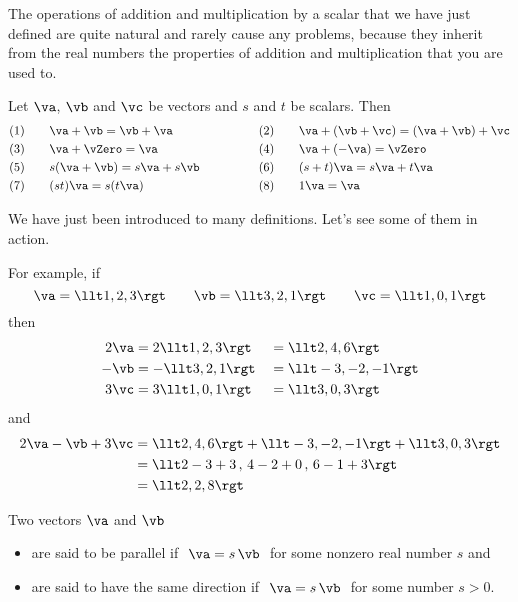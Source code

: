 The operations of addition and multiplication by a scalar that we have just
defined are quite natural and rarely cause any problems, because 
they inherit from the real numbers the properties of  addition and 
multiplication that you are used to. 
\begin{theorem}
                    \label{thm:addScalMult}
Let $\va$, $\vb$ and $\vc$ be vectors and $s$ and $t$ be scalars. Then 
\begin{alignat*}{5}
& (1)\quad&&\va+\vb=\vb+\va \qquad\qquad\qquad
&& (2)\quad&&\va+(\vb+\vc)=(\va+\vb)+\vc\\
& (3) &&\va+\vZero =\va 
&& (4) &&\va+(-\va)=\vZero\\
& (5) &&s(\va+\vb)=s\va+s\vb
&& (6) &&(s+t)\va=s\va+t\va\\
& (7) &&(st)\va = s(t\va)
&& (8) &&1\va=\va\\
\end{alignat*}
\end{theorem}

\noindent We have just been introduced to many definitions. Let's
see some of them in action.
\begin{eg}
For example, if 
\begin{equation*}
\va = \llt 1,2,3\rgt\qquad
\vb = \llt 3,2,1\rgt\qquad
\vc = \llt 1,0,1\rgt
\end{equation*}
then
\begin{alignat*}{3}
2\va&=2\llt 1,2,3\rgt&&=\llt 2,4,6\rgt \\
-\vb&=-\llt 3,2,1\rgt&&=\llt -3,-2,-1\rgt \\
3\vc&=3\llt 1,0,1\rgt&&=\llt 3,0,3\rgt
\end{alignat*}
and 
\begin{align*}
2\va-\vb+3\vc 
&= \llt 2,4,6\rgt + \llt -3,-2,-1\rgt+\llt 3,0,3\rgt \\
&= \llt 2-3+3\,,\,4-2+0\,,\,6-1+3\rgt \\
&= \llt 2,2,8 \rgt
\end{align*}
\end{eg}\goodbreak

\begin{defn}\label{def parallel vectors}
Two vectors $\va$ and $\vb$
\begin{itemize}
\item
are said to be parallel if $\ \va= s\,\vb\ $ for some nonzero real number $s$ and
\item
are said to have the same direction if $\ \va=s\,\vb\ $ for some number $s>0$.
\end{itemize} 
\end{defn}


